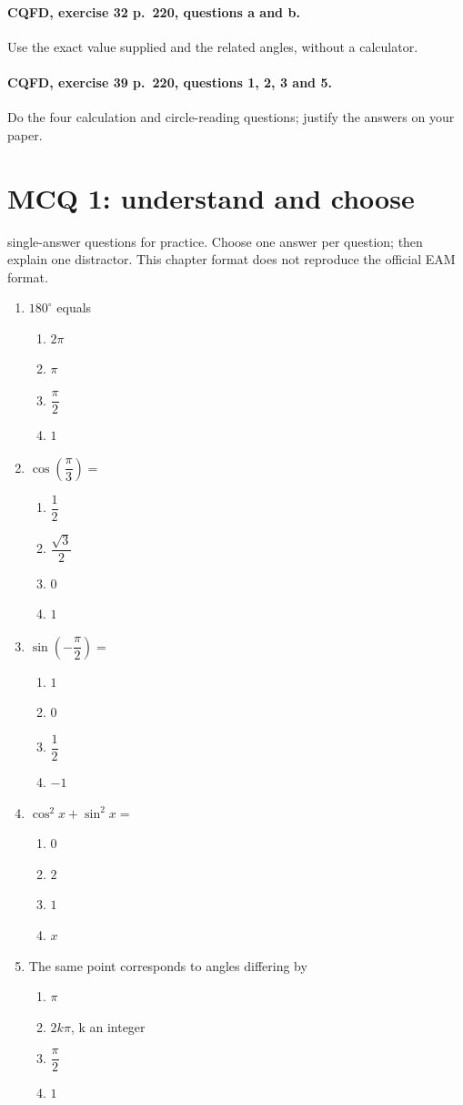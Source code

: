 \paragraph{CQFD, exercise 32 p.~220, questions a and b.}\label{C10-M1} Use the exact value supplied and the related angles, without a calculator.
\paragraph{CQFD, exercise 39 p.~220, questions 1, 2, 3 and 5.}\label{C10-M2} Do the four calculation and circle-reading questions; justify the answers on your paper.
\begingroup\small
\mxnewpage\section*{MCQ 1: understand and choose}\label{C10-Q1}
 single-answer questions for practice. Choose one answer per question; then explain one distractor. This chapter format does not reproduce the official EAM format.
\begin{enumerate}
\item $180^\circ$ equals
\begin{enumerate}[label=\Alph*.,itemsep=2pt]
\item $2\pi$
\item $\pi$
\item $\dfrac{\pi}{2}$
\item $1$
\end{enumerate}
\item $\cos (\dfrac{\pi}{3})=$
\begin{enumerate}[label=\Alph*.,itemsep=2pt]
\item $\dfrac{1}{2}$
\item $\dfrac{\sqrt 3}{2}$
\item $0$
\item $1$
\end{enumerate}
\item $\sin (-\dfrac{\pi}{2})=$
\begin{enumerate}[label=\Alph*.,itemsep=2pt]
\item $1$
\item $0$
\item $\dfrac{1}{2}$
\item $-1$
\end{enumerate}
\item $\cos^2x+\sin^2x=$
\begin{enumerate}[label=\Alph*.,itemsep=2pt]
\item $0$
\item $2$
\item $1$
\item $x$
\end{enumerate}
\item The same point corresponds to angles differing by
\begin{enumerate}[label=\Alph*.,itemsep=2pt]
\item $\pi$
\item $2k\pi$, k an integer
\item $\dfrac{\pi}{2}$
\item $1$
\end{enumerate}
\end{enumerate}
